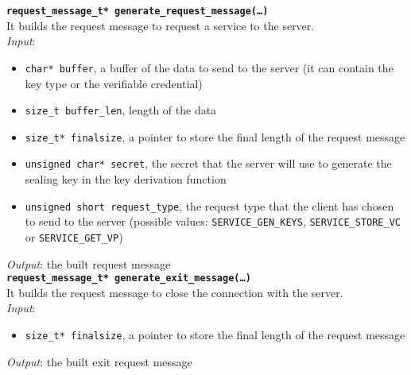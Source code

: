 \noindent
\texttt{\bfseries request\_message\_t* generate\_request\_message(\dots)}\\
It builds the request message to request a service to the server. \\
\textit{Input}:
\begin{itemize}[noitemsep,nolistsep]
  \item \texttt{char* buffer}, a buffer of the data to send to the server (it can contain the key type or the verifiable credential)
  \item \texttt{size\_t buffer\_len}, length of the data
  \item \texttt{size\_t* finalsize}, a pointer to store the final length of the request message
  \item \texttt{unsigned char* secret}, the secret that the server will use to generate the sealing key in the key derivation function
  \item \texttt{unsigned short request\_type}, the request type that the client has chosen to send to the server (possible values: \texttt{SERVICE\_GEN\_KEYS}, \texttt{SERVICE\_STORE\_VC} or \texttt{SERVICE\_GET\_VP})
\end{itemize}
\textit{Output}: the built request message \\

\noindent
\texttt{\bfseries request\_message\_t* generate\_exit\_message(\dots)}\\
It builds the request message to close the connection with the server. \\
\textit{Input}:
\begin{itemize}[noitemsep,nolistsep]
  \item \texttt{size\_t* finalsize}, a pointer to store the final length of the request message
\end{itemize}
\textit{Output}: the built exit request message



   

